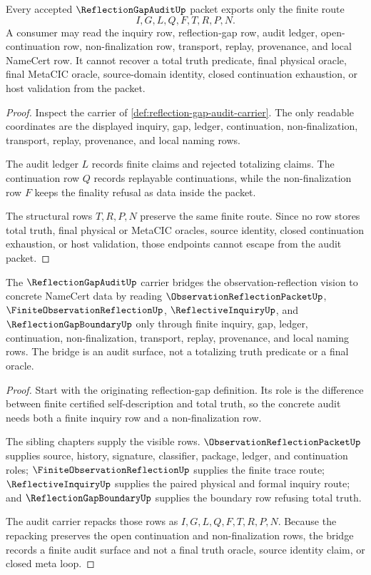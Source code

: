 \begin{theorem}
\label{thm:reflection-gap-audit-nonescape}
Every accepted $\ReflectionGapAuditUp$ packet exports only the finite route
$$
I,G,L,Q,F,T,R,P,N.
$$
A consumer may read the inquiry row, reflection-gap row, audit ledger, open-continuation row, non-finalization row, transport, replay, provenance, and local NameCert row. It cannot recover a total truth predicate, final physical oracle, final MetaCIC oracle, source-domain identity, closed continuation exhaustion, or host validation from the packet.
\end{theorem}
\begin{proof}
Inspect the carrier of \autoref{def:reflection-gap-audit-carrier}. The only readable coordinates are the displayed inquiry, gap, ledger, continuation, non-finalization, transport, replay, provenance, and local naming rows.

The audit ledger $L$ records finite claims and rejected totalizing claims. The continuation row $Q$ records replayable continuations, while the non-finalization row $F$ keeps the finality refusal as data inside the packet.

The structural rows $T,R,P,N$ preserve the same finite route. Since no row stores total truth, final physical or MetaCIC oracles, source identity, closed continuation exhaustion, or host validation, those endpoints cannot escape from the audit packet.
\end{proof}

\begin{theorem}
\label{thm:reflection-gap-audit-bridge}
The $\ReflectionGapAuditUp$ carrier bridges the observation-reflection vision to concrete NameCert data by reading $\ObservationReflectionPacketUp$, $\FiniteObservationReflectionUp$, $\ReflectiveInquiryUp$, and $\ReflectionGapBoundaryUp$ only through finite inquiry, gap, ledger, continuation, non-finalization, transport, replay, provenance, and local naming rows. The bridge is an audit surface, not a totalizing truth predicate or a final oracle.
\end{theorem}
\begin{proof}
Start with the originating reflection-gap definition. Its role is the difference between finite certified self-description and total truth, so the concrete audit needs both a finite inquiry row and a non-finalization row.

The sibling chapters supply the visible rows. $\ObservationReflectionPacketUp$ supplies source, history, signature, classifier, package, ledger, and continuation roles; $\FiniteObservationReflectionUp$ supplies the finite trace route; $\ReflectiveInquiryUp$ supplies the paired physical and formal inquiry route; and $\ReflectionGapBoundaryUp$ supplies the boundary row refusing total truth.

The audit carrier repacks those rows as $I,G,L,Q,F,T,R,P,N$. Because the repacking preserves the open continuation and non-finalization rows, the bridge records a finite audit surface and not a final truth oracle, source identity claim, or closed meta loop.
\end{proof}

